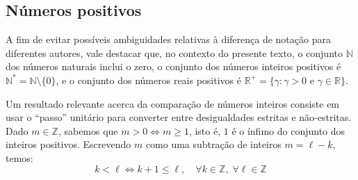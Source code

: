 \subsection*{Números positivos}

A fim de evitar possíveis ambiguidades
relativas à diferença de notação para diferentes autores,
vale destacar que, no contexto do presente texto,
o conjunto $\mathds{N}$ dos números naturais inclui o zero,
o conjunto dos números inteiros positivos é
$\mathds{N}^* = \mathds{N} \setminus \{0\}$,
e o conjunto dos números reais positivos é
$\mathds{R}^+ =
 \{\gamma: \gamma > 0 \text{ e } \gamma \in \mathds{R}\}$.

Um resultado relevante acerca da comparação de números inteiros
consiste em usar o ``passo'' unitário
para converter entre desigualdades estritas e não-estritas.
Dado $m \in \mathds{Z}$, sabemos que $m > 0 \iff m \ge 1$,
isto é, $1$ é o ínfimo do conjunto dos inteiros positivos.
Escrevendo $m$ como uma subtração de inteiros $m = \ell - k$, temos:
\begin{equation}\label{int+1}
  k < \ell \iff k + 1 \le \ell,
  \quad \forall k \in \mathds{Z}, \; \forall \ell \in \mathds{Z}
\end{equation}
